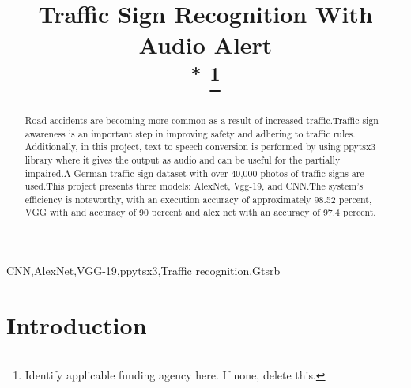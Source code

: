 \documentclass[conference]{IEEEtran}
\begin{document}
\title{Traffic Sign Recognition With Audio Alert
\\
{\footnotesize \textsuperscript{*}}
\thanks{Identify applicable funding agency here. If none, delete this.}
}

\author{
\and
{}
\and
{}
\and
}

\maketitle

\begin{abstract}
Road accidents are becoming more common as a result of increased traffic.Traffic sign awareness is an important step in improving safety and adhering to traffic rules. Additionally, in this project, text to speech conversion is performed by using ppytsx3 library where it gives the output as audio and can be useful for the partially impaired.A German traffic sign dataset with over 40,000 photos of traffic signs are used.This project presents three models: AlexNet, Vgg-19, and CNN.The system's efficiency is noteworthy, with an execution accuracy of approximately 98.52 percent, VGG with and accuracy of 90 percent and alex net with an accuracy of 97.4 percent.
\end{abstract}

\begin{IEEEkeywords}
CNN,AlexNet,VGG-19,ppytsx3,Traffic recognition,Gtsrb
\end{IEEEkeywords}

\section{Introduction}
\end{document}
